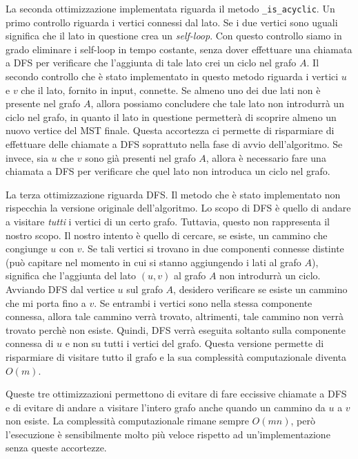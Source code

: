 La seconda ottimizzazione implementata riguarda il metodo
\verb|_is_acyclic|. Un primo controllo riguarda i vertici
connessi dal lato. Se i due vertici sono uguali significa
che il lato in questione crea un \textit{self-loop}. Con
questo controllo siamo in grado eliminare i self-loop in
tempo costante, senza dover effettuare una chiamata a DFS per verificare
che l'aggiunta di tale lato crei un ciclo nel grafo $A$.
Il secondo controllo che è stato implementato in questo metodo
riguarda i vertici $u$ e $v$ che il lato, fornito in input, connette.
Se almeno uno dei due lati non è presente nel grafo $A$, allora
possiamo concludere che tale lato non introdurrà un ciclo nel grafo,
in quanto il lato in questione permetterà di scoprire almeno un nuovo
vertice del MST finale. Questa accortezza ci permette di risparmiare
di effettuare delle chiamate a DFS soprattuto nella fase di avvio
dell'algoritmo. Se invece, sia $u$ che $v$ sono già presenti
nel grafo $A$, allora è necessario fare una chiamata a DFS per verificare
che quel lato non introduca un ciclo nel grafo.

La terza ottimizzazione riguarda DFS. Il metodo che è stato implementato
non rispecchia la versione originale dell'algoritmo. Lo scopo di DFS
è quello di andare a visitare \textit{tutti} i vertici di un certo
grafo. Tuttavia, questo non rappresenta il nostro scopo. Il nostro
intento è quello di cercare, se esiste, un cammino che congiunge $u$ con
$v$. Se tali vertici si trovano in due componenti connesse distinte
(può capitare nel momento in cui si stanno aggiungendo i lati al
grafo $A$), significa che l'aggiunta del lato $(u, v)$ al grafo $A$ non
introdurrà un ciclo. Avviando DFS dal vertice $u$ sul grafo $A$,
desidero verificare se esiste un cammino che mi porta fino a $v$.
Se entrambi i vertici sono nella stessa componente connessa, allora
tale cammino verrà trovato, altrimenti, tale cammino non verrà
trovato perchè non esiste. Quindi, DFS verrà eseguita soltanto sulla
componente connessa di $u$ e non su tutti i vertici del grafo.
Questa versione permette di risparmiare di visitare tutto il grafo
e la sua complessità computazionale diventa $O(m)$.

Queste tre ottimizzazioni permettono di evitare di fare eccissive
chiamate a DFS e di evitare di andare a visitare l'intero grafo
anche quando un cammino da $u$ a $v$ non esiste. La complessità
computazionale rimane sempre $O(mn)$, però l'esecuzione è sensibilmente
molto più veloce rispetto ad un'implementazione senza queste accortezze.

